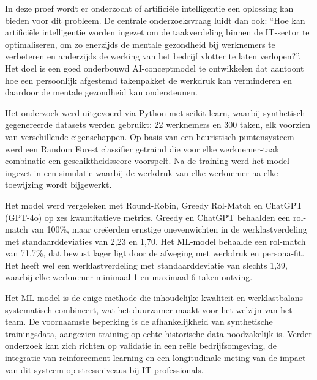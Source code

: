 In deze proef wordt er onderzocht of artificiële intelligentie een oplossing kan bieden voor dit probleem. De centrale onderzoeksvraag luidt dan ook: ``Hoe kan artificiële intelligentie worden ingezet om de taakverdeling binnen de IT-sector te optimaliseren, om zo enerzijds de mentale gezondheid bij werknemers te verbeteren en anderzijds de werking van het bedrijf vlotter te laten verlopen?''. Het doel is een goed onderbouwd AI-conceptmodel te ontwikkelen dat aantoont hoe een persoonlijk afgestemd takenpakket de werkdruk kan verminderen en daardoor de mentale gezondheid kan ondersteunen.

Het onderzoek werd uitgevoerd via Python met scikit-learn, waarbij synthetisch gegenereerde datasets werden gebruikt: 22 werknemers en 300 taken, elk voorzien van verschillende eigenschappen. Op basis van een heuristisch puntensysteem werd een Random Forest classifier getraind die voor elke werknemer-taak combinatie een geschiktheidsscore voorspelt. Na de training werd het model ingezet in een simulatie waarbij de werkdruk van elke werknemer na elke toewijzing wordt bijgewerkt.

Het model werd vergeleken met Round-Robin, Greedy Rol-Match en ChatGPT (GPT-4o) op zes kwantitatieve metrics. Greedy en ChatGPT behaalden een rol-match van 100\%, maar creëerden ernstige onevenwichten in de werklastverdeling met standaarddeviaties van 2,23 en 1,70. Het ML-model behaalde een rol-match van 71,7\%, dat bewust lager ligt door de afweging met werkdruk en persona-fit. Het heeft wel een werklastverdeling met standaarddeviatie van slechts 1,39, waarbij elke werknemer minimaal 1 en maximaal 6 taken ontving.

Het ML-model is de enige methode die inhoudelijke kwaliteit en werklastbalans systematisch combineert, wat het duurzamer maakt voor het welzijn van het team. De voornaamste beperking is de afhankelijkheid van synthetische trainingsdata, aangezien training op echte historische data noodzakelijk is. Verder onderzoek kan zich richten op validatie in een reële bedrijfsomgeving, 
de integratie van reinforcement learning en een longitudinale meting van de impact van dit systeem op stressniveaus bij IT-professionals.